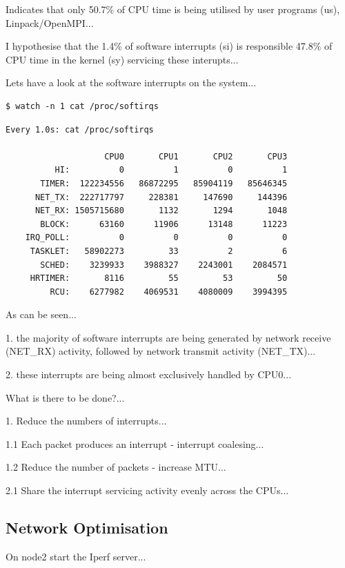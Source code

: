 \documentclass{report}
\begin{document}
Indicates that only 50.7\% of CPU time is being utilised by user programs (us), Linpack/OpenMPI...

I hypothesise that the 1.4\% of software interrupts (si) is responsible 47.8\% of CPU time in the kernel (sy) servicing these interupts...

Lets have a look at the software interrupts on the system...

\lstset{style=type}
\begin{lstlisting}
$ watch -n 1 cat /proc/softirqs
\end{lstlisting}


\lstset{style=type}
\begin{lstlisting}
Every 1.0s: cat /proc/softirqs

                    CPU0       CPU1       CPU2       CPU3
          HI:          0          1          0          1
       TIMER:  122234556   86872295   85904119   85646345
      NET_TX:  222717797     228381     147690     144396
      NET_RX: 1505715680       1132       1294       1048
       BLOCK:      63160      11906      13148      11223
    IRQ_POLL:          0          0          0          0
     TASKLET:   58902273         33          2          6
       SCHED:    3239933    3988327    2243001    2084571
     HRTIMER:       8116         55         53         50
         RCU:    6277982    4069531    4080009    3994395
\end{lstlisting}

As can be seen...

1. the majority of software interrupts are being generated by network receive (NET\_RX) activity, followed by network transmit activity (NET\_TX)...

2. these interrupts are being almost exclusively handled by CPU0...

What is there to be done?...

1. Reduce the numbers of interrupts...

1.1 Each packet produces an interrupt - interrupt coalesing...

1.2 Reduce the number of packets - increase MTU...

2.1 Share the interrupt servicing activity evenly across the CPUs...


%
%
\subsection{Network Optimisation}

On node2 start the Iperf server...
\end{document}
